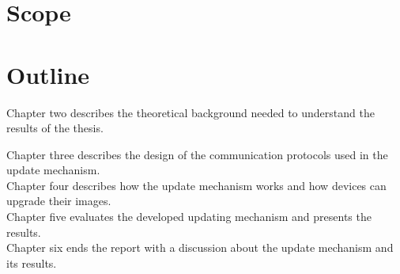 \documentclass[0-thesis.tex]{subfiles}
\begin{document}
\section{Scope}

\section{Outline}
Chapter two describes the theoretical background needed to understand the results of the thesis.\newline

Chapter three describes the design of the communication protocols used in the update mechanism.\\

Chapter four describes how the update mechanism works and how devices can upgrade their images.\\

Chapter five evaluates the developed updating mechanism and presents the results.\\

Chapter six ends the report with a discussion about the update mechanism and its results.\\
\end{document}

